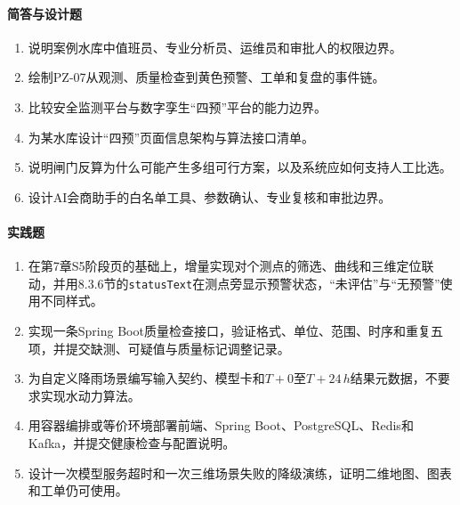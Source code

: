 \paragraph{简答与设计题}
\begin{enumerate}[resume]
\item 说明案例水库中值班员、专业分析员、运维员和审批人的权限边界。
\item 绘制PZ-07从观测、质量检查到黄色预警、工单和复盘的事件链。
\item 比较安全监测平台与数字孪生“四预”平台的能力边界。
\item 为某水库设计“四预”页面信息架构与算法接口清单。
\item 说明闸门反算为什么可能产生多组可行方案，以及系统应如何支持人工比选。
\item 设计AI会商助手的白名单工具、参数确认、专业复核和审批边界。

\end{enumerate}

\paragraph{实践题}
\begin{enumerate}[resume]
\item 在第7章S5阶段页的基础上，增量实现对\cpStationCount 个测点的筛选、曲线和三维定位联动，并用8.3.6节的\texttt{statusText}在测点旁显示预警状态，“未评估”与“无预警”使用不同样式。
\item 实现一条Spring Boot质量检查接口，验证格式、单位、范围、时序和重复五项，并提交缺测、可疑值与质量标记调整记录。
\item 为自定义降雨场景编写输入契约、模型卡和$T+0$至$T+24\,h$结果元数据，不要求实现水动力算法。
\item 用容器编排或等价环境部署前端、Spring Boot、PostgreSQL、Redis和Kafka，并提交健康检查与配置说明。
\item 设计一次模型服务超时和一次三维场景失败的降级演练，证明二维地图、图表和工单仍可使用。
\end{enumerate}
